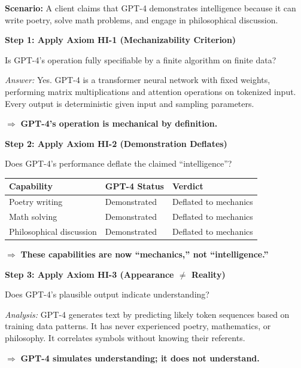 \begin{tcolorbox}[colback=yellow!5!white, colframe=yellow!75!black,
    title=\textbf{Worked Example: Is GPT-4 ``Intelligent''?}]

\textbf{Scenario:} A client claims that GPT-4 demonstrates intelligence because it can write poetry, solve math problems, and engage in philosophical discussion.

\textbf{Step 1: Apply Axiom HI-1 (Mechanizability Criterion)}

Is GPT-4's operation fully specifiable by a finite algorithm on finite data?

\textit{Answer:} Yes. GPT-4 is a transformer neural network with fixed weights, performing matrix multiplications and attention operations on tokenized input. Every output is deterministic given input and sampling parameters.

$\Rightarrow$ \textbf{GPT-4's operation is mechanical by definition.}

\textbf{Step 2: Apply Axiom HI-2 (Demonstration Deflates)}

Does GPT-4's performance deflate the claimed ``intelligence''?

\begin{center}
\begin{tabular}{lll}
\textbf{Capability} & \textbf{GPT-4 Status} & \textbf{Verdict} \\
\midrule
Poetry writing & Demonstrated & Deflated to mechanics \\
Math solving & Demonstrated & Deflated to mechanics \\
Philosophical discussion & Demonstrated & Deflated to mechanics \\
\end{tabular}
\end{center}

$\Rightarrow$ \textbf{These capabilities are now ``mechanics,'' not ``intelligence.''}

\textbf{Step 3: Apply Axiom HI-3 (Appearance $\neq$ Reality)}

Does GPT-4's plausible output indicate understanding?

\textit{Analysis:} GPT-4 generates text by predicting likely token sequences based on training data patterns. It has never experienced poetry, mathematics, or philosophy. It correlates symbols without knowing their referents.

$\Rightarrow$ \textbf{GPT-4 simulates understanding; it does not understand.}


\end{tcolorbox}
